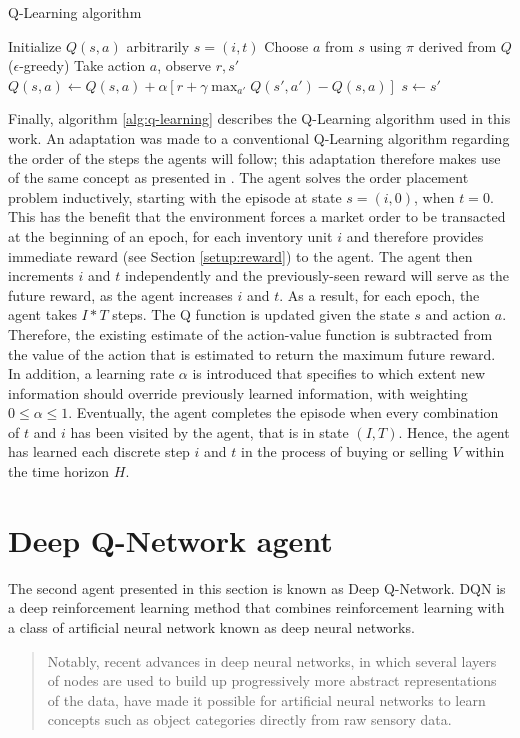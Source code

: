 \begin{algorithm}
\caption{Q-Learning algorithm}\label{alg:q-learning}
\begin{algorithmic}[1]
\State Initialize $Q(s,a)$ arbitrarily
\State $s=(i, t)$
\State Choose $a$ from $s$ using $\pi$ derived from $Q$ ($\epsilon$-greedy)
\State Take action $a$, observe $r, s'$
\State $Q(s,a) \gets Q(s,a)+ \alpha[r+ \gamma \max_{a'}Q(s',a')-Q(s,a)]$
\State $s \gets s'$
\EndFor
\EndFor
\EndFor
\end{algorithmic}
\end{algorithm}
Finally, algorithm \ref{alg:q-learning} describes the Q-Learning algorithm used in this work.
An adaptation was made to a conventional Q-Learning algorithm\cite{sutton1998reinforcement} regarding the order of the steps the agents will follow; this adaptation therefore makes use of the same concept as presented in \cite{nevmyvaka2006reinforcement}.
The agent solves the order placement problem inductively, starting with the episode at state $s=(i,0)$, when $t=0$.
This has the benefit that the environment forces a market order to be transacted at the beginning of an epoch, for each inventory unit $i$ and therefore provides immediate reward (see Section \ref{setup:reward}) to the agent.
The agent then increments $i$ and $t$ independently and the previously-seen reward will serve as the future reward, as the agent increases $i$ and $t$.
As a result, for each epoch, the agent takes $I*T$ steps.
The Q function is updated given the state $s$ and action $a$.
Therefore, the existing estimate of the action-value function is subtracted from the value of the action that is estimated to return the maximum future reward.
In addition, a learning rate $\alpha$ is introduced that specifies to which extent new information should override previously learned information, with weighting $0 \le \alpha \le 1$.
Eventually, the agent completes the episode when every combination of $t$ and $i$ has been visited by the agent, that is in state $(I, T)$.
Hence, the agent has learned each discrete step $i$ and $t$ in the process of buying or selling $V$ within the time horizon $H$.

\section{Deep Q-Network agent}
\label{setup:dqn}
The second agent presented in this section is known as Deep Q-Network\cite{mnih2015human}.
DQN is a deep reinforcement learning method that combines reinforcement learning with a class of artificial neural network known as deep neural networks.
\begin{quote}
Notably, recent advances in deep neural networks, in which several layers of nodes are used to build up progressively more abstract representations of the data, have made it possible for artificial neural networks to learn concepts such as object categories directly from raw sensory data.\cite{mnih2015human}
\end{quote}


